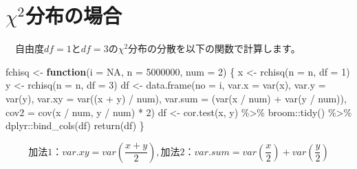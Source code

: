 \documentclass[a4paper]{tufte-handout}
\newenvironment{Shaded}{}{}
\newcommand{\AttributeTok}[1]{\textcolor[rgb]{0.49,0.56,0.16}{#1}}
\newcommand{\ConstantTok}[1]{\textcolor[rgb]{0.53,0.00,0.00}{#1}}
\newcommand{\ControlFlowTok}[1]{\textcolor[rgb]{0.00,0.44,0.13}{\textbf{#1}}}
\newcommand{\DecValTok}[1]{\textcolor[rgb]{0.25,0.63,0.44}{#1}}
\newcommand{\FunctionTok}[1]{\textcolor[rgb]{0.02,0.16,0.49}{#1}}
\newcommand{\NormalTok}[1]{#1}
\newcommand{\OtherTok}[1]{\textcolor[rgb]{0.00,0.44,0.13}{#1}}
\newcommand{\SpecialCharTok}[1]{\textcolor[rgb]{0.25,0.44,0.63}{#1}}
\begin{document}
\newpage

\hypertarget{chi2ux5206ux5e03ux306eux5834ux5408}{%
\section{\texorpdfstring{\textbf{\(\chi^2\)分布の場合}}{\textbackslash chi\^{}2分布の場合}}\label{chi2ux5206ux5e03ux306eux5834ux5408}}

　自由度\(df = 1\)と\(df = 3\)の\(\chi^2\)分布の分散を以下の関数で計算します。

\begin{Shaded}
\begin{Highlighting}[numbers=left,,]
\NormalTok{fchisq }\OtherTok{\textless{}{-}} \ControlFlowTok{function}\NormalTok{(}\AttributeTok{i =} \ConstantTok{NA}\NormalTok{, }\AttributeTok{n =} \DecValTok{5000000}\NormalTok{, }\AttributeTok{num =} \DecValTok{2}\NormalTok{) \{}
\NormalTok{  x }\OtherTok{\textless{}{-}} \FunctionTok{rchisq}\NormalTok{(}\AttributeTok{n =}\NormalTok{ n, }\AttributeTok{df =} \DecValTok{1}\NormalTok{)}
\NormalTok{  y }\OtherTok{\textless{}{-}} \FunctionTok{rchisq}\NormalTok{(}\AttributeTok{n =}\NormalTok{ n, }\AttributeTok{df =} \DecValTok{3}\NormalTok{)}
\NormalTok{  df }\OtherTok{\textless{}{-}} \FunctionTok{data.frame}\NormalTok{(}\AttributeTok{no =}\NormalTok{ i,}
                   \AttributeTok{var.x =} \FunctionTok{var}\NormalTok{(x), }\AttributeTok{var.y =} \FunctionTok{var}\NormalTok{(y),}
                   \AttributeTok{var.xy =} \FunctionTok{var}\NormalTok{((x }\SpecialCharTok{+}\NormalTok{ y) }\SpecialCharTok{/}\NormalTok{ num), }\AttributeTok{var.sum =}\NormalTok{ (}\FunctionTok{var}\NormalTok{(x }\SpecialCharTok{/}\NormalTok{ num) }\SpecialCharTok{+} \FunctionTok{var}\NormalTok{(y }\SpecialCharTok{/}\NormalTok{ num)),}
                   \AttributeTok{cov2 =} \FunctionTok{cov}\NormalTok{(x }\SpecialCharTok{/}\NormalTok{ num, y }\SpecialCharTok{/}\NormalTok{ num) }\SpecialCharTok{*} \DecValTok{2}\NormalTok{)}
\NormalTok{  df }\OtherTok{\textless{}{-}} \FunctionTok{cor.test}\NormalTok{(x, y) }\SpecialCharTok{\%\textgreater{}\%}\NormalTok{ broom}\SpecialCharTok{::}\FunctionTok{tidy}\NormalTok{() }\SpecialCharTok{\%\textgreater{}\%}\NormalTok{ dplyr}\SpecialCharTok{::}\FunctionTok{bind\_cols}\NormalTok{(df)}
  \FunctionTok{return}\NormalTok{(df)}
\NormalTok{\}}
\end{Highlighting}
\end{Shaded}

\[\mbox{加法1：}var.xy = var(\frac{x + y}{2}),　\mbox{加法2：}var.sum = var(\frac{x}{2}) + var(\frac{y}{2})\]
\end{document}
